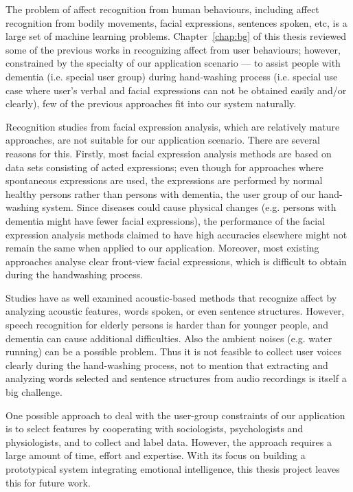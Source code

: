 The problem of affect recognition from human behaviours, including affect recognition from bodily movements, facial expressions, sentences spoken, etc, is a large set of machine learning problems. Chapter~\ref{chap:bg} of this thesis reviewed some of the previous works in recognizing affect from user behaviours; however, constrained by the specialty of our application scenario --- to assist people with dementia (i.e. special user group) during hand-washing process (i.e. special use case where user's verbal and facial expressions can not be obtained easily and/or clearly), few of the previous approaches fit into our system naturally.

Recognition studies from facial expression analysis, which are relatively mature approaches, are not suitable for our application scenario. There are several reasons for this. Firstly, most facial expression analysis methods are based on data sets consisting of acted expressions; even though for approaches where spontaneous expressions are used, the expressions are performed by normal healthy persons rather than persons with dementia, the user group of our hand-washing system. Since diseases could cause physical changes (e.g. persons with dementia might have fewer facial expressions), the performance of the facial expression analysis methods claimed to have high accuracies elsewhere might not remain the same when applied to our application. Moreover, most existing approaches analyse clear front-view facial expressions, which is difficult to obtain during the handwashing process. 

Studies have as well examined acoustic-based methods that recognize affect by analyzing acoustic features, words spoken, or even sentence structures. However, speech recognition for elderly persons is harder than for younger people, and dementia can cause additional difficulties. Also the ambient noises (e.g. water running) can be a possible problem. Thus it is not feasible to collect user voices clearly during the hand-washing process, not to mention that extracting and analyzing words selected and sentence structures from audio recordings is itself a big challenge. 

One possible approach to deal with the user-group constraints of our application is to select features by cooperating with sociologists, psychologists and physiologists, and to collect and label data. However, the approach requires a large amount of time, effort and expertise. With its focus on building a prototypical system integrating emotional intelligence, this thesis project leaves this for future work.

